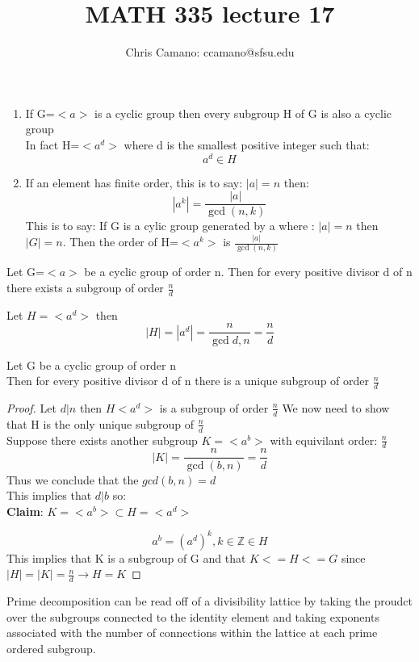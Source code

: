 \documentclass[11pt]{article}
\author{Chris Camano: ccamano@sfsu.edu}
\title{MATH 335  lecture 17 }
\date
\theoremstyle{definition}  %
\newcommand{\Z}{\mathbb{Z}}
\newcommand{\block}[2]{\begin{tcolorbox}[title={#1}]{#2}\end{tcolorbox}}
\begin{document}
\maketitle

\block{Recap of main ideas relating to cyclic groups}{
\begin{enumerate}
  \item If G=$<a>$ is a cyclic group then every subgroup H of G is also a cyclic group\\
  In fact H=$<a^d>$ where d is the smallest positive integer such that:
  \[
    a^d\in H
  \]
  \item If an element has finite order, this is to say: $|a|=n$ then:
  \[
    |a^k|=\frac{|a|}{\gcd(n,k)}
  \]
  This is to say: If G is a cylic group generated by a where : $|a|=n$ then $|G|=n$. Then the order of H=$<a^k>$ is $\frac{|a|}{\gcd(n,k)}$
\end{enumerate}
}
\proposition Let G=$<a>$ be a cyclic group of order n. Then for every positive divisor d of n there exists a subgroup of order $\frac{n}{d}$ \\
\begin{proof }
  Let $H=<a^d>$ then
  \[
    |H|=|a^d|=\frac{n}{\gcd{d,n}}=\frac{n}{d}
  \]
\end{proof }
\block{Theorem}{
\Theorem Let G be a cyclic group of order n\\
Then for every positive divisor d of n there is a unique subgroup of order $\frac{n}{d}$\\}
\begin{proof}
Let $d|n$ then $H<a^d>$ is a subgroup of order $\frac{n}{d}$  We now  need to show that H is the only unique subgroup of $\frac{n}{d}$\\
Suppose there exists another subgroup $K=<a^b>$ with equivilant order: $\frac{n}{d}$ \\
\[
  |K|=\frac{n}{\gcd(b,n)}=\frac{n}{d}
\]
Thus we conclude that the $gcd(b,n)=d$\\
This implies that $d|b$ so:\\
\textbf{Claim}:
$K=<a^b>\subset H=<a^d>$

\[
  a^b=(a^d)^k, k \in \Z\in H
\]
This implies that K is a subgroup of G and that $K<=H<=G$ since $|H|=|K|=\frac{n}{d}\rightarrow H=K$
\end{proof}
Prime decomposition can be read off of a divisibility lattice by taking the proudct over the subgroups connected to the identity element and taking exponents associated with the number of connections within the lattice at each prime ordered subgroup.
\end{document}
